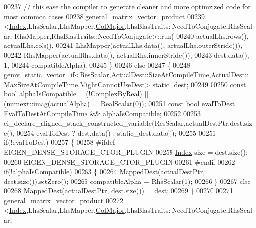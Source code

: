 \begin{DoxyCode}
00237       \textcolor{comment}{// this ease the compiler to generate cleaner and more optimzized code for most common cases}
00238       \hyperlink{struct_eigen_1_1internal_1_1general__matrix__vector__product}{general\_matrix\_vector\_product}
00239           <\hyperlink{namespace_eigen_a62e77e0933482dafde8fe197d9a2cfde}{Index},LhsScalar,LhsMapper,\hyperlink{group__enums_ggaacded1a18ae58b0f554751f6cdf9eb13a0cbd4bdd0abcfc0224c5fcb5e4f6669a}{ColMajor},LhsBlasTraits::NeedToConjugate,RhsScalar,
      RhsMapper,RhsBlasTraits::NeedToConjugate>::run(
00240           actualLhs.rows(), actualLhs.cols(),
00241           LhsMapper(actualLhs.data(), actualLhs.outerStride()),
00242           RhsMapper(actualRhs.data(), actualRhs.innerStride()),
00243           dest.data(), 1,
00244           compatibleAlpha);
00245     \}
00246     \textcolor{keywordflow}{else}
00247     \{
00248       
      \hyperlink{struct_eigen_1_1internal_1_1gemv__static__vector__if}{
      gemv\_static\_vector\_if<ResScalar,ActualDest::SizeAtCompileTime,ActualDest::MaxSizeAtCompileTime,MightCannotUseDest>}
       static\_dest;
00249 
00250       \textcolor{keyword}{const} \textcolor{keywordtype}{bool} alphaIsCompatible = (!ComplexByReal) || (numext::imag(actualAlpha)==RealScalar(0));
00251       \textcolor{keyword}{const} \textcolor{keywordtype}{bool} evalToDest = EvalToDestAtCompileTime && alphaIsCompatible;
00252 
00253       ei\_declare\_aligned\_stack\_constructed\_variable(ResScalar,actualDestPtr,dest.size(),
00254                                                     evalToDest ? dest.data() : static\_dest.data());
00255 
00256       \textcolor{keywordflow}{if}(!evalToDest)
00257       \{
00258 \textcolor{preprocessor}{        #ifdef EIGEN\_DENSE\_STORAGE\_CTOR\_PLUGIN}
00259         \hyperlink{namespace_eigen_a62e77e0933482dafde8fe197d9a2cfde}{Index} size = dest.size();
00260         EIGEN\_DENSE\_STORAGE\_CTOR\_PLUGIN
00261 \textcolor{preprocessor}{        #endif}
00262         \textcolor{keywordflow}{if}(!alphaIsCompatible)
00263         \{
00264           MappedDest(actualDestPtr, dest.size()).setZero();
00265           compatibleAlpha = RhsScalar(1);
00266         \}
00267         \textcolor{keywordflow}{else}
00268           MappedDest(actualDestPtr, dest.size()) = dest;
00269       \}
00270 
00271       \hyperlink{struct_eigen_1_1internal_1_1general__matrix__vector__product}{general\_matrix\_vector\_product}
00272           <\hyperlink{namespace_eigen_a62e77e0933482dafde8fe197d9a2cfde}{Index},LhsScalar,LhsMapper,\hyperlink{group__enums_ggaacded1a18ae58b0f554751f6cdf9eb13a0cbd4bdd0abcfc0224c5fcb5e4f6669a}{ColMajor},LhsBlasTraits::NeedToConjugate,RhsScalar,

\end{DoxyCode}
